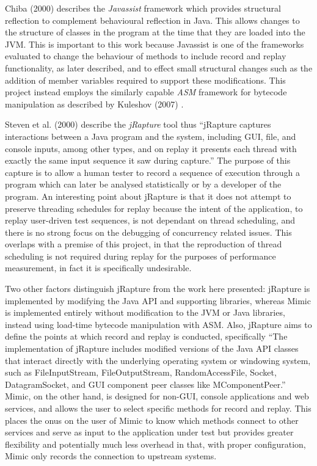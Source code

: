 \documentclass[]{final_report}
\begin{document}
Chiba (2000) \cite{chiba:2000} describes the \textit{Javassist} framework which provides structural reflection to complement behavioural reflection in Java. This allows changes to the structure of classes in the program at the time that they are loaded into the JVM. This is important to this work because Javassist is one of the frameworks evaluated to change the behaviour of methods to include record and replay functionality, as later described, and to effect small structural changes such as the addition of member variables required to support these modifications. This project instead employs the similarly capable \textit{ASM} framework for bytecode manipulation as described by Kuleshov (2007) \cite{kuleshov:2007}.

Steven et al. (2000) \cite{steven:2000} describe the \textit{jRapture} tool thus ``jRapture captures interactions between a Java program and the system, including GUI, file, and console inputs, among other types, and on replay it presents each thread with exactly the same input sequence it saw during capture.'' The purpose of this capture is to allow a human tester to record a sequence of execution through a program which can later be analysed statistically or by a developer of the program. An interesting point about jRapture is that it does not attempt to preserve threading schedules for replay because the intent of the application, to replay user-driven test sequences, is not dependant on thread scheduling, and there is no strong focus on the debugging of concurrency related issues. This overlaps with a premise of this project, in that the reproduction of thread scheduling is not required during replay for the purposes of performance measurement, in fact it is specifically undesirable.

Two other factors distinguish jRapture from the work here presented: jRapture is implemented by modifying the Java API and supporting libraries, whereas Mimic is implemented entirely without modification to the JVM or Java libraries, instead using load-time bytecode manipulation with ASM. Also, jRapture aims to define the points at which record and replay is conducted, specifically ``The implementation of jRapture includes modified versions of the Java API classes that interact directly with the underlying operating system or windowing system, such as FileInputStream, FileOutputStream, RandomAccessFile, Socket, DatagramSocket, and GUI component peer classes like MComponentPeer.'' \cite{steven:2000} Mimic, on the other hand, is designed for non-GUI, console applications and web services, and allows the user to select specific methods for record and replay. This places the onus on the user of Mimic to know which methods connect to other services and serve as input to the application under test but provides greater flexibility and potentially much less overhead in that, with proper configuration, Mimic only records the connection to upstream systems.
\end{document}

